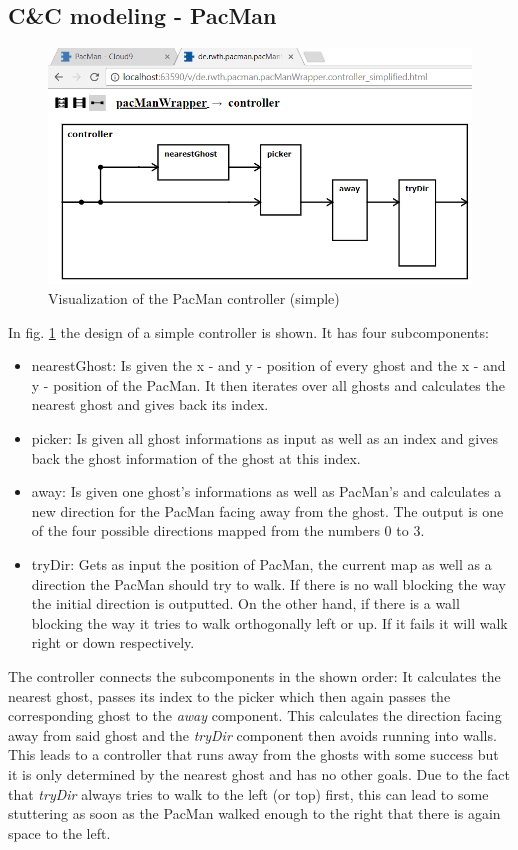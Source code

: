 \subsection{C\&C modeling - PacMan}
\begin{figure}
	\label{fig:visPacmanSimple}
	\centering
	\includegraphics[scale=0.7]{pictures/VisualizationPacManSimple.png}
	\caption{Visualization of the PacMan controller (simple)}
\end{figure}
In fig. \ref{fig:visPacmanSimple} the design of a simple controller is shown. It has four subcomponents:
\begin{itemize}
	\item nearestGhost: Is given the x - and y - position of every ghost and the x - and y - position of the PacMan. It then iterates over all ghosts and calculates the nearest ghost and gives back its index.
	\item picker: Is given all ghost informations as input as well as an index and gives back the ghost information of the ghost at this index.
	\item away: Is given one ghost's informations as well as PacMan's and calculates a new direction for the PacMan facing away from the ghost. The output is one of the four possible directions mapped from the numbers 0 to 3.
	\item tryDir: Gets as input the position of PacMan, the current map as well as a direction the PacMan should try to walk. If there is no wall blocking the way the initial direction is outputted. On the other hand, if there is a wall blocking the way it tries to walk orthogonally left or up. If it fails it will walk right or down respectively.
\end{itemize}
The controller connects the subcomponents in the shown order: It calculates the nearest ghost, passes its index to the picker which then again passes the corresponding ghost to the \textit{away} component. This calculates the direction facing away from said ghost and the \textit{tryDir} component then avoids running into walls. This leads to a controller that runs away from the ghosts with some success but it is only determined by the nearest ghost and has no other goals. Due to the fact that \textit{tryDir} always tries to walk to the left (or top) first, this can lead to some stuttering as soon as the PacMan walked enough to the right that there is again space to the left. \newline
